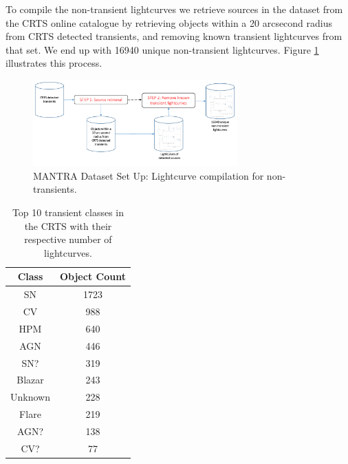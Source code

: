 \documentclass[twocolumn]{aastex62}
\begin{document}
To compile the non-transient lightcurves we retrieve sources in the
dataset from the CRTS online catalogue by retrieving objects within a
20 arcsecond radius from CRTS detected transients, 
and removing known transient lightcurves from that set. 
We end up with 16940 unique non-transient lightcurves. Figure \ref{fig:non-transients} illustrates this process.

\begin{figure}
\begin{center}
  \includegraphics[width=0.7\textwidth]{NonTransients.pdf}
\end{center}
  \caption{MANTRA Dataset Set Up: Lightcurve compilation for non-transients.}
  \label{fig:non-transients}
\end{figure} 

\begin{table}
\centering
\begin{tabular}{c|c}
    \hline
    Class &  Object Count \\
    \hline
SN & 1723 \\
CV & 988 \\
HPM & 640 \\
AGN & 446 \\
SN? & 319 \\
Blazar & 243 \\
Unknown & 228 \\
Flare & 219 \\
AGN? & 138 \\
CV? & 77 \\
    \hline
\end{tabular}
\caption{Top 10 transient classes in the CRTS with their respective number of lightcurves.} 
\label{table:top_classes}
\end{table}
\end{document}
